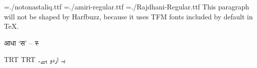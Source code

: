 \pagewidth=210mm
\pageheight=297mm
\hsize=210mm
\hsize=190mm
\hoffset=10mm
\nopagenumbers
\parindent=0mm
\font\noto={./notonastaliq.ttf}
\font\amiri={./amiri-regular.ttf}
\font\raj={./Rajdhani-Regular.ttf}
This paragraph will not be shaped by Harfbuzz, because it uses TFM fonts included by default in \TeX.

\raj
आधा ‘स’ – स्‍

\textdir TRT
\pardir TRT
\noto
یہ اردو ہے۔
\bye
